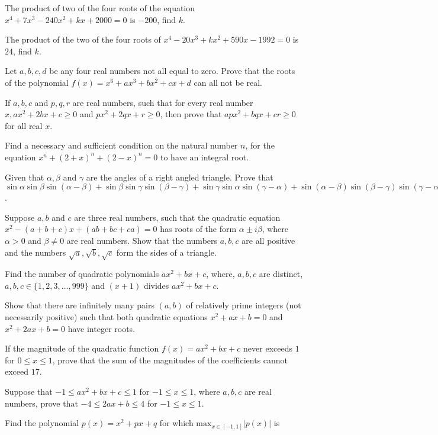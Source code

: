 \item The product of two of the four roots of the equation $x^4 + 7x^3 -240x^2 + kx + 2000 = 0$ is $-200$,
  find $k$.
\item The product of the two of the four roots of $x^4 - 20x^3 + kx^2 + 590x - 1992 = 0$ is $24$, find $k$.
\item Let $a, b, c, d$ be any four real numbers not all equal to zero. Prove that the roots of the
  polynomial $f(x) = x^6 + ax^3 + bx^2 + cx + d$ can all not be real.
\item If $a, b, c$ and $p, q, r$ are real numbers, such that for every real number $x, ax^2 + 2bx + c\geq 0$
  and $px^2 + 2qx + r \geq 0$, then prove that $apx^2 + bqx + cr\geq 0$ for all real $x$.
\item Find a necessary and sufficient condition on the natural number $n$, for the equation $x^n + (2 + x)^n
  + (2 - x)^n = 0$ to have an integral root.
\item Given that $\alpha, \beta$ and $\gamma$ are the angles of a right angled triangle. Prove that
  $\sin\alpha\sin\beta\sin(\alpha - \beta) + \sin\beta\sin\gamma\sin(\beta - \gamma) +
  \sin\gamma\sin\alpha\sin(\gamma - \alpha) + \sin(\alpha - \beta)\sin(\beta - \gamma)\sin(\gamma - \alpha)
  = 0$.
\item Suppose $a, b$ and $c$ are three real numbers, such that the quadratic equation $x^2 - (a + b + c)x +
  (ab + bc + ca) = 0$ has roots of the form $\alpha\pm i\beta$, where $\alpha > 0$ and $\beta\neq0$ are
  real numbers. Show that the numbers $a, b, c$ are all positive and the numbers $\sqrt{a}, \sqrt{b},
  \sqrt{c}$ form the sides of a triangle.
\item Find the number of quadratic polynomials $ax^2 + bx + c$, where, $a, b, c$ are distinct, $a, b,
  c\in\{1, 2, 3, \ldots, 999\}$ and $(x + 1)$ divides $ax^2 + bx + c$.
\item Show that there are infinitely many pairs $(a, b)$ of relatively prime integers (not necessarily
  positive) such that both quadratic equations $x^2 + ax + b = 0$ and $x^2 + 2ax + b = 0$ have integer
  roots.
\item If the magnitude of the quadratic function $f(x) = ax^2 + bx + c$ never exceeds $1$ for $0\leq x\leq
  1$, prove that the sum of the magnitudes of the coefficients cannot exceed $17$.
\item Suppose that $-1\leq ax^2 + bx + c\leq 1$ for $-1\leq x\leq 1$, where $a, b, c$ are real numbers,
  prove that $-4\leq 2ax + b\leq 4$ for $-1\leq x\leq 1$.
\item Find the polynomial $p(x) = x^2 + px + q$ for which $\mathrm{max}_{x\in[-1, 1]}|p(x)|$ is
